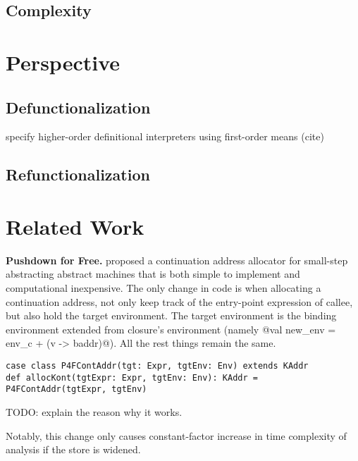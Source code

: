 \documentclass[acmsmall,review,anonymous]{acmart}\settopmatter{printfolios=true,printccs=false,printacmref=false}
\begin{document}
\subsection{Complexity}

\section{Perspective}

\subsection{Defunctionalization}

specify higher-order definitional interpreters using first-order means (cite)

\subsection{Refunctionalization}


\section{Related Work}

\textbf{Pushdown for Free.}
\citeauthor{gilray2016pushdown} proposed a continuation address allocator for 
small-step abstracting abstract machines that is both simple to implement and
computational inexpensive.
The only change in code is when allocating a continuation address, not only
keep track of the entry-point expression of callee, but also hold the target environment.
The target environment is the binding environment extended from closure's environment
(namely @val new_env = env_c + (v -> baddr)@). All the rest things remain the same.

\begin{lstlisting}
case class P4FContAddr(tgt: Expr, tgtEnv: Env) extends KAddr
def allocKont(tgtExpr: Expr, tgtEnv: Env): KAddr = P4FContAddr(tgtExpr, tgtEnv)
\end{lstlisting}

TODO: explain the reason why it works.

Notably, this change only causes constant-factor increase in time complexity of analysis
if the store is widened.
\end{document}
